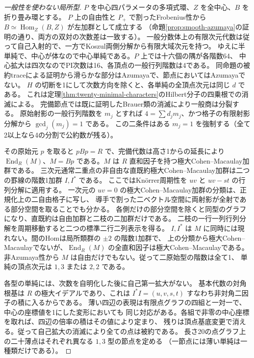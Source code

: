 \begin{proof}[一般性を使わない局所型]
$P$ を中心四パラメータの多項式環、$Z$ を全中心、$B$ を折り畳み環とする。
$P$ 上の自由性と $P_+$ で割ったFrobenius性から
$B\simeq\operatorname{Hom}_Z(B,Z)$ が左加群として成立する
（命題\ref{prop:smooth-azumaya}の証明の通り、両方の双対の次数差は一致する）。
一般分数体上の有限次元代数は従って自己入射的で、一方でKoszul両側分解から有限大域次元を持つ。
ゆえに半単純で、中心が体なので中心単純である。$P$ 上では十六個の隅が各階数64、
中心拡大は四次なのでPI次数は16、各頂点の一般行列階数は4である。
同命題の被約traceによる証明から滑らかな部分はAzumayaで、節点においてはAzumayaでない。
$H$ の切断を1にして次数方向を除くと、各単純の全頂点次元は同じ $d$ である。
これは定理\ref{thm:twenty-minimal-characters}のHilbert分子の四乗根での消滅による。
完備節点では既に証明したBrauer類の消滅により一般商は分裂する。
原始射影の一般行列階数を $m_j$ とすれば
$4=\sum d_jm_j$、かつ格子の有限射影分解から $\gcd_j(m_j)=1$ である。
この二条件はある $m_j=1$ を強制する（全て2以上なら4の分割で公約数が残る）。

その原始元 $p$ を取ると $pBp=R$ で、完備代数は高さ1からの延長により
$\operatorname{End}_R(M)$、$M=Bp$ である。$M$ は $R$ 直和因子を持つ極大Cohen--Macaulay加群である。
三次元通常二重点の非自由な直既約極大Cohen--Macaulay加群は二つの罫線の階数1加群 $I,I^*$ である。
ここではKn\"orrer周期性を $uv$ と $uv-st$ の行列分解に適用する。
一次元の $uv=0$ の極大Cohen--Macaulay加群の分類は、正規化上の二自由格子に写し、
導手で割った二ベクトル空間に両射影が全射である部分空間を取ることでも分かる。
各側だけの部分空間を除くと同型のグラフになり、直既約は自由加群と二枝の二加群だけである。
二枝の一行一列行列分解を周期移動すると二つの標準二行二列表示を得る。
$I,I^*$ は $M$ に同時には現れない。間のHomは局所類群の $\pm2$ の階数1加群で、
上の分類から極大Cohen--Macaulayでないが、$\operatorname{End}_R(M)$ の全直和因子は極大Cohen--Macaulayである。
非Azumaya性から $M$ は自由だけでもない。従って二原始型の階数は全て1、
単純の頂点次元は $1,3$ または $2,2$ である。

各型の単純には、次数を自明化した後に自己第一拡大がない。
基本代数の対角根基は $R$ の極大イデアルであり、これは
$I^*I=(u,v,s,t)$ すなわち非対角二因子の積に入るからである。
薄い四辺の表現は有限点グラフの四組と一対一で、中心の座標値を1にした変形においても
同じ対応がある。各組で非零の中心座標を取れば、四辺の倍率の積はその値により定まり、
残りは頂点基底変更で消える。従って自己拡大の消滅により全ての点は被約である。
長さ20の点グラフ上の二十薄点はそれぞれ異なる $1,3$ 型の節点を定める
（一節点には薄い単純は一種類だけである）。
\end{proof}

